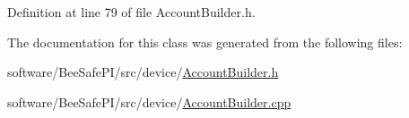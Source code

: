 Definition at line 79 of file Account\+Builder.\+h.



The documentation for this class was generated from the following files\+:\begin{DoxyCompactItemize}
\item 
software/\+Bee\+Safe\+P\+I/src/device/\hyperlink{_account_builder_8h}{Account\+Builder.\+h}\item 
software/\+Bee\+Safe\+P\+I/src/device/\hyperlink{_account_builder_8cpp}{Account\+Builder.\+cpp}\end{DoxyCompactItemize}
